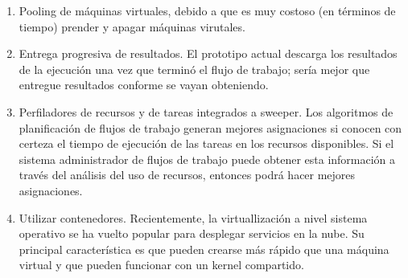 \begin{enumerate}
\item{Pooling de m\'aquinas virtuales, debido a que es muy costoso (en t\'erminos de tiempo) prender y apagar m\'aquinas virutales.}
\item{Entrega progresiva de resultados. El prototipo actual descarga los resultados de la ejecuci\'on una vez que termin\'o el flujo de trabajo; ser\'ia mejor que entregue resultados conforme se vayan obteniendo.}
\item{Perfiladores de recursos y de tareas integrados a sweeper. Los algoritmos de planificación de flujos de trabajo generan mejores asignaciones si conocen con certeza el tiempo de ejecución de las tareas en los recursos disponibles. Si el sistema administrador de flujos de trabajo puede obtener esta información a través del análisis del uso de recursos, entonces podrá hacer mejores asignaciones.}
\item{Utilizar contenedores. Recientemente, la virtuallizaci\'on a nivel sistema operativo se ha vuelto popular para desplegar servicios en la nube. Su principal caracter\'istica es que pueden crearse m\'as r\'apido que una m\'aquina virtual y que pueden funcionar con un kernel compartido.}
\end{enumerate}

